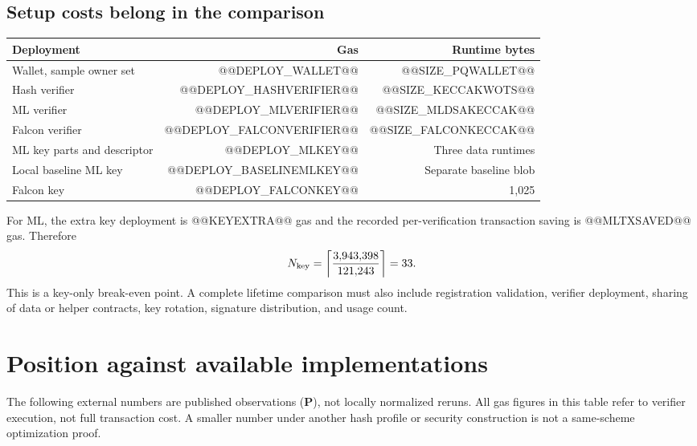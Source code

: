 \documentclass[11pt,a4paper]{article}
\newcommand{\published}{\textbf{P}}
\begin{document}
\subsection{Setup costs belong in the comparison}
\begin{tabularx}{\linewidth}{Yrr}
\toprule
\textbf{Deployment} & \textbf{Gas} & \textbf{Runtime bytes}\\
\midrule
Wallet, sample owner set & @@DEPLOY_WALLET@@ & @@SIZE_PQWALLET@@\\
Hash verifier & @@DEPLOY_HASHVERIFIER@@ & @@SIZE_KECCAKWOTS@@\\
ML verifier & @@DEPLOY_MLVERIFIER@@ & @@SIZE_MLDSAKECCAK@@\\
Falcon verifier & @@DEPLOY_FALCONVERIFIER@@ & @@SIZE_FALCONKECCAK@@\\
ML key parts and descriptor & @@DEPLOY_MLKEY@@ & Three data runtimes\\
Local baseline ML key & @@DEPLOY_BASELINEMLKEY@@ & Separate baseline blob\\
Falcon key & @@DEPLOY_FALCONKEY@@ & 1,025\\
\bottomrule
\end{tabularx}

For ML, the extra key deployment is @@KEYEXTRA@@ gas and the recorded
per-verification transaction saving is @@MLTXSAVED@@ gas. Therefore
\begin{equation}
 N_{\rm key}=\left\lceil\frac{3{,}943{,}398}{121{,}243}\right\rceil=33.
\end{equation}
This is a key-only break-even point. A complete lifetime comparison must also
include registration validation, verifier deployment, sharing of data or
helper contracts, key rotation, signature distribution, and usage count.

\newpage
\section{Position against available implementations}
The following external numbers are published observations (\published), not
locally normalized reruns. All gas figures in this table refer to verifier
execution, not full transaction cost. A smaller number under another hash
profile or security construction is not a same-scheme optimization proof.
\end{document}
